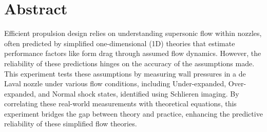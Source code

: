 \thispagestyle{plain} %



\chapter*{Abstract} %
    Efficient propulsion design relies on understanding supersonic flow within nozzles, often predicted by simplified one-dimensional (1D) theories that estimate performance factors like form drag through assumed flow dynamics. However, the reliability of these predictions hinges on the accuracy of the assumptions made. This experiment tests these assumptions by measuring wall pressures in a de Laval nozzle under various flow conditions, including Under-expanded, Over-expanded, and Normal shock states, identified using Schlieren imaging. By correlating these real-world measurements with theoretical equations, this experiment bridges the gap between theory and practice, enhancing the predictive reliability of these simplified flow theories. 



